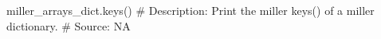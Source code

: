 miller_arrays_dict.keys()
# Description:  Print the miller keys() of a miller dictionary.
# Source:  NA

